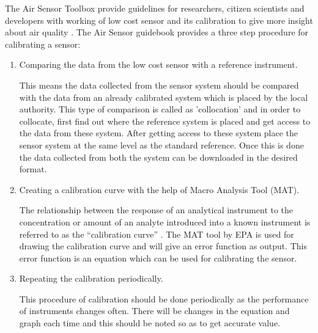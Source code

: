 \documentclass[12pt,a4paper,oneside]{report}
\begin{document}
The Air Sensor Toolbox provide guidelines for researchers, citizen scientists and developers with working of low cost sensor and its calibration to give more insight about air quality \cite{airsensortoolbox}. The Air Sensor guidebook\cite{airsensorguidebook} provides a three step procedure for calibrating a sensor:
\begin{enumerate}
    \item Comparing the data from the low cost sensor with a reference instrument.
    
This means the data collected from the sensor system should be compared with the data from an already calibrated system which is placed by the local authority. This type of comparison is called as 'collocation' and in order to collocate, first find out where the reference system is placed and get access to the data from these system. After getting access to these system place the sensor system at the same level as the standard reference. Once this is done the data collected from both the system can be downloaded in the desired format.

    \item Creating a calibration curve with the help of Macro Analysis Tool (MAT).

The relationship between the response of an analytical instrument to the concentration or amount of an analyte introduced into a known instrument is referred to as the “calibration curve” \cite{Epa2010}. The MAT tool by EPA is used for drawing the calibration curve and will give an error function as output. This error function is an equation which can be used for calibrating the sensor.
    \item Repeating the calibration periodically.

    This procedure of calibration should be done periodically as the performance of instruments changes often. There will be changes in the equation and graph each time and this should be noted so as to get accurate value.
\end{enumerate} 
\end{document}
